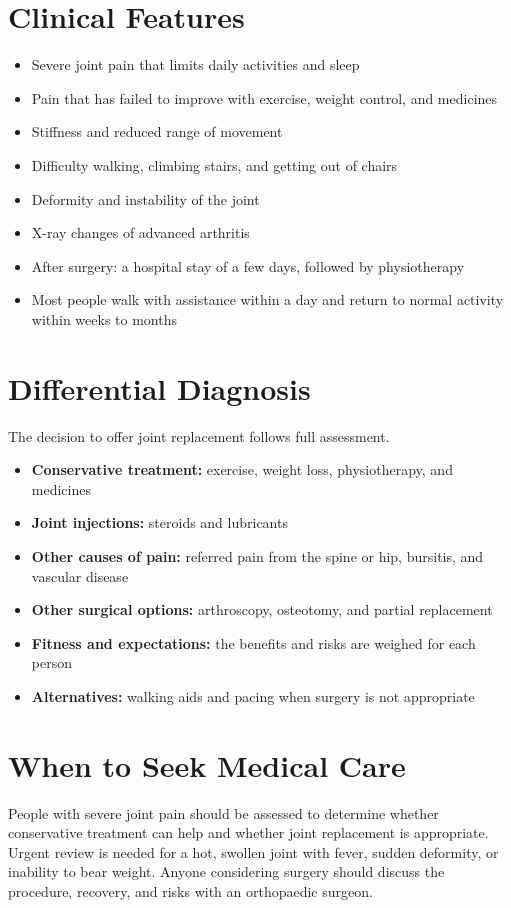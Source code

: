 \section*{Clinical Features}
\begin{itemize}
    \item Severe joint pain that limits daily activities and sleep
    \item Pain that has failed to improve with exercise, weight control, and medicines
    \item Stiffness and reduced range of movement
    \item Difficulty walking, climbing stairs, and getting out of chairs
    \item Deformity and instability of the joint
    \item X-ray changes of advanced arthritis
    \item After surgery: a hospital stay of a few days, followed by physiotherapy
    \item Most people walk with assistance within a day and return to normal activity within weeks to months
\end{itemize}

\section*{Differential Diagnosis}
The decision to offer joint replacement follows full assessment.
\begin{itemize}
    \item \textbf{Conservative treatment:} exercise, weight loss, physiotherapy, and medicines
    \item \textbf{Joint injections:} steroids and lubricants
    \item \textbf{Other causes of pain:} referred pain from the spine or hip, bursitis, and vascular disease
    \item \textbf{Other surgical options:} arthroscopy, osteotomy, and partial replacement
    \item \textbf{Fitness and expectations:} the benefits and risks are weighed for each person
    \item \textbf{Alternatives:} walking aids and pacing when surgery is not appropriate
\end{itemize}

\section*{When to Seek Medical Care}
People with severe joint pain should be assessed to determine whether conservative treatment can help and whether joint replacement is appropriate. Urgent review is needed for a hot, swollen joint with fever, sudden deformity, or inability to bear weight. Anyone considering surgery should discuss the procedure, recovery, and risks with an orthopaedic surgeon.

